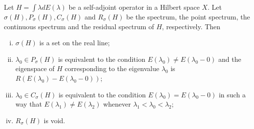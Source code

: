 \begin{theorem}\label{thm:XI.8.Theorem.1} Let $H = \int \lambda dE(\lambda)$ be a self-adjoint operator in a Hilbert space $X$. Let $\sigma(H), P_{\sigma}(H), C_{\sigma}(H)$ and $R_{\sigma}(H)$ be the spectrum, the point spectrum, the continuous spectrum and the residual spectrum of $H$, respectively. Then \begin{enumerate}[(i)]
\item $\sigma(H)$ is a set on the real line;
\item $\lambda_0 \in P_{\sigma}(H)$ is equivalent to the condition $E(\lambda_0) \neq E(\lambda_0 - 0)$ and the eigenspace of $H$ corresponding to the eigenvalue $\lambda_0$ is $R(E(\lambda_0) - E(\lambda_0 - 0))$;
\item $\lambda_0 \in C_{\sigma}(H)$ is equivalent to the condition $E(\lambda_0) = E(\lambda_0 - 0)$ in such a way that $E(\lambda_1) \neq E(\lambda_2)$ whenever $\lambda_1 < \lambda_0 < \lambda_2$;
\item $R_{\sigma}(H)$ is void.
\end{enumerate}
\end{theorem}

